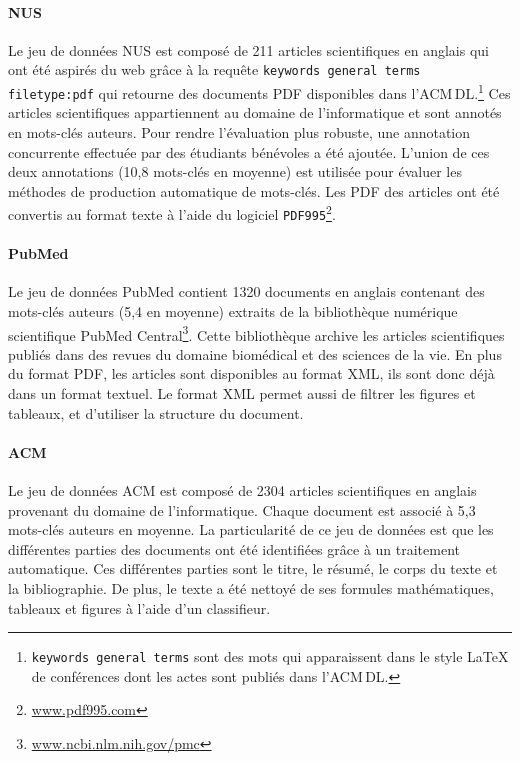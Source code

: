 \paragraph{NUS~\cite{goh_keyphrase_2007}}\label{par:nus}
Le jeu de données NUS est composé de 211 articles scientifiques en anglais qui ont été aspirés du web grâce à la requête \texttt{keywords general terms filetype:pdf} qui retourne des documents PDF disponibles dans l'ACM\,DL.\footnote{\texttt{keywords general terms} sont des mots qui apparaissent dans le style \LaTeX{} de conférences dont les actes sont publiés dans l'ACM\,DL.}
Ces articles scientifiques appartiennent au domaine de l'informatique et sont annotés en mots-clés auteurs. Pour rendre l'évaluation plus robuste, une annotation concurrente effectuée par des étudiants bénévoles a été ajoutée. L'union de ces deux annotations (10,8 mots-clés en moyenne) est utilisée pour évaluer les méthodes de production automatique de mots-clés.
Les PDF des articles ont été convertis au format texte à l'aide du logiciel \texttt{PDF995}\footnote{\url{www.pdf995.com}}.


\paragraph{PubMed~\cite{schutz_keyphrase_2008}}
Le jeu de données PubMed contient \num{1320} documents en anglais contenant des mots-clés auteurs (5,4 en moyenne) extraits de la bibliothèque numérique scientifique PubMed Central\footnote{\url{www.ncbi.nlm.nih.gov/pmc}}.
Cette bibliothèque archive les articles scientifiques publiés dans des revues du domaine biomédical et des sciences de la vie.
En plus du format PDF, les articles sont disponibles au format XML, ils sont donc déjà dans un format textuel. Le format XML permet aussi de filtrer les figures et tableaux, et d'utiliser la structure du document.


\paragraph{ACM~\cite{krapivin_large_2009}}
Le jeu de données ACM est composé de \num{2304} articles scientifiques en anglais provenant du domaine de l'informatique.
Chaque document est associé à 5,3 mots-clés auteurs en moyenne.
La particularité de ce jeu de données est que les différentes parties des documents ont été identifiées grâce à un traitement automatique. Ces différentes parties sont le titre, le résumé, le corps du texte et la bibliographie.
De plus, le texte a été nettoyé de ses formules mathématiques, tableaux et figures à l'aide d'un classifieur.


